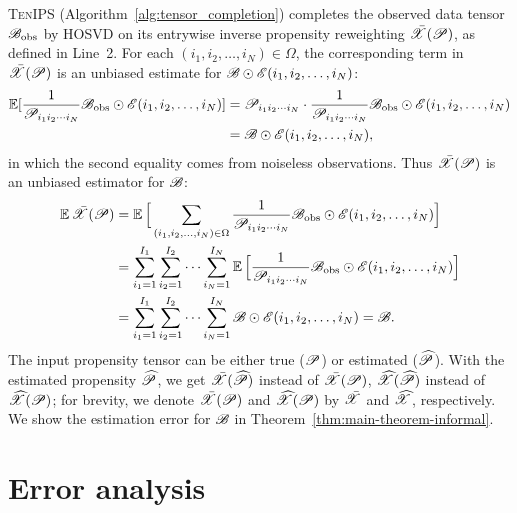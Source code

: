 \documentclass{article}
\newcommand{\T}[2][]{#1\mathscr{\MakeUppercase{#2}}}
\newcommand{\Expect}{\operatorname{\mathbb{E}}}
\def\Xh{\widehat X}
\theoremstyle{plain}
\begin{document}
\textsc{TenIPS} (Algorithm~\ref{alg:tensor_completion}) completes the observed data tensor $\T{B}_\mathrm{obs}$ by HOSVD on its entrywise inverse propensity reweighting $\bar{\T{X}}(\T{P})$, as defined in Line~2. 
For each $(i_1, i_2, \dots, i_N) \in \Omega$, the corresponding term in $\bar{\T{X}}(\T{P})$ is an unbiased estimate for $ \T{B} \odot \T{E}(i_1, i_2, \dots, i_N)$: 
\begin{equation}
	\begin{aligned}
		\Expect [\frac{1}{\T{P}_{i_1 i_2 \cdots i_N}} \T{B}_\text{obs} \odot \T{E}(i_1, i_2, \dots, i_N)] & = \T{P}_{i_1 i_2 \cdots i_N} \cdot \frac{1}{\T{P}_{i_1 i_2 \cdots i_N}} \T{B}_\text{obs} \odot \T{E}(i_1, i_2, \dots, i_N)\\
		& = \T{B} \odot \T{E}(i_1, i_2, \dots, i_N),
	\end{aligned}
	\nonumber
\end{equation}
in which the second equality comes from noiseless observations.
Thus $\bar{\T{X}}(\T{P})$ is an unbiased estimator for $\T{B}$: 
\begin{equation}
	\begin{aligned}
		\Expect \bar{\T{X}}(\T{P}) & = \Expect \Big[\sum_{(i_1, i_2, \dots, i_N) \in \Omega} \frac{1}{\T{P}_{i_1 i_2 \cdots i_N}} \T{B}_\text{obs} \odot \T{E}(i_1, i_2, \dots, i_N)\Big]\\
		& = \sum_{i_1=1}^{I_1} \sum_{i_2=1}^{I_2} \cdots \sum_{i_N=1}^{I_N} \Expect \Big[\frac{1}{\T{P}_{i_1 i_2 \cdots i_N}} \T{B}_\text{obs} \odot \T{E}(i_1, i_2, \dots, i_N) \Big]\\
		& = \sum_{i_1=1}^{I_1} \sum_{i_2=1}^{I_2} \cdots \sum_{i_N=1}^{I_N} \T{B} \odot \T{E}(i_1, i_2, \dots, i_N) = \T{B}.
	\end{aligned}
	\nonumber
\end{equation}
The input propensity tensor can be either true ($\T{P}$) or estimated ($\widehat{\T{P}}$). 
With the estimated propensity $\widehat{\T{P}}$, we get $\bar{\T{X}}(\widehat{\T{P}})$ instead of $\bar{\T{X}}(\T{P})$, $\widehat{\T{X}}(\widehat{\T{P}})$ instead of $\widehat{\T{X}}(\T{P})$;
for brevity, we denote $\bar{\T{X}}(\T{P})$ and $\T{\Xh}(\T{P})$ by $\bar{\T{X}}$ and $\T{\Xh}$, respectively.
We show the estimation error for $\T{B}$ in Theorem~\ref{thm:main-theorem-informal}.

\section{Error analysis}
\label{sec:error_analysis}
\end{document}
